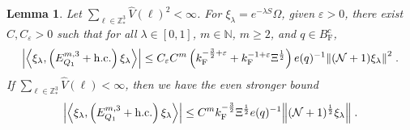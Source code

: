 \documentclass[12pt,a4paper]{article}
\numberwithin{equation}{section}
\newcommand{\NNN}{\mathbb{N}}
\newcommand{\1}{\mathbb{I}}
\newcommand{\F}{\mathrm{F}}
\newcommand{\Z}{\mathbb{Z}}
\newcommand{\NN}{\mathcal{N}}
\newcommand{\half}{\frac{1}{2}}
\newcommand{\eva}[1]{\left\langle #1 \right\rangle}
\theoremstyle{plain}
\newtheorem{lemma}[theorem]{Lemma}
\theoremstyle{definition}
\theoremstyle{remark}
\theoremstyle{plain}
\theoremstyle{definition}
\theoremstyle{remark}
\begin{document}
\begin{lemma} \label{lem:EQ112}
Let $ \sum_{\ell \in \Z^3_*} \hat{V}(\ell)^2 < \infty $. For $\xi_\lambda = e^{-\lambda S} \Omega$, given $ \varepsilon > 0 $, there exist $ C, C_\varepsilon > 0 $ such that for all $ \lambda \in [0,1] $, $ m \in \NNN $, $ m \ge 2 $, and $ q \in B_{\F}^c $,
\begin{align} \label{eq:estEQ112_Coulomb}
	\abs{\eva{\xi_\lambda,\left(E^{m,3}_{Q_1}+\mathrm{h.c.}\right) \xi_\lambda }}
	\leq C_\varepsilon C^m \left( k_{\F}^{-\frac 32 + \varepsilon}
		+ k_{\F}^{-1 + \varepsilon} \Xi^\half \right)
		e(q)^{-1}
		\norm{(\NN+1) \xi_\lambda }^2 \;.
\end{align}
If $ \sum_{\ell \in \Z^3_*} \hat{V}(\ell) < \infty $, then we have the even stronger bound
\begin{align} \label{eq:estEQ112}
	\abs{\eva{\xi_\lambda,\left(E^{m,3}_{Q_1}+\mathrm{h.c.}\right) \xi_\lambda }}
	\leq C^m k_{\F}^{-\frac{3}{2}} \Xi^{\half} e(q)^{-1}
		\norm{(\NN+1)^\half \xi_\lambda } \;.
\end{align}
\end{lemma}
\end{document}
